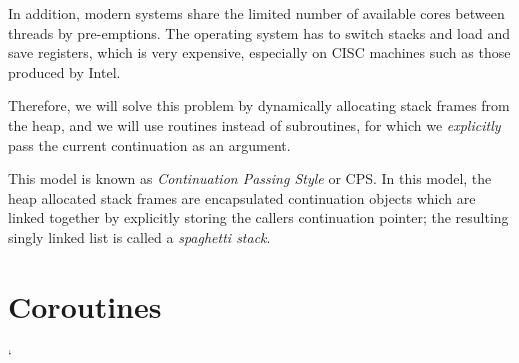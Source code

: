 \documentclass[oneside]{book}
\begin{document}
In addition, modern systems share the limited number of available
cores between threads by pre-emptions. The operating system has to switch
stacks and load and save registers, which is very expensive, especially
on CISC machines such as those produced by Intel.

Therefore, we will solve this problem by dynamically allocating
stack frames from the heap, and we will use routines instead 
of subroutines, for which we {\em explicitly} pass the current
continuation as an argument.

This model is known as {\em Continuation Passing Style} or CPS.
In this model, the heap allocated stack frames are encapsulated
continuation objects which are linked together by explicitly
storing the callers continuation pointer; the resulting singly
linked list is called a {\em spaghetti stack}.

\chapter{Coroutines}
`
\end{document}
